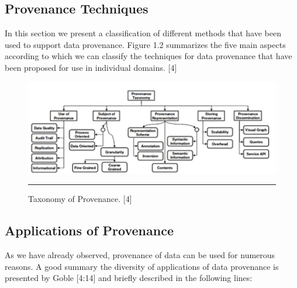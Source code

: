\subsection{Provenance Techniques}

In this section we present a classification of different methods that have been used to support data provenance. Figure 1.2 summarizes the five main aspects according to which we can classify the techniques for data provenance that have been proposed for use in individual domains. [4]

\begin{figure}[htbp]
	\centering
		\includegraphics{./Figures/figure2.pdf}
		\rule{35em}{0.5pt}
	\caption[Taxonomy of Provenance]{Taxonomy of Provenance. [4]}
	\label{fig:provTaxonomy}
\end{figure}


\subsection{Applications of Provenance}

As we have already observed, provenance of data can be used for numerous reasons. A good summary the diversity of applications of data provenance is presented by Goble [4:14] and briefly described in the following lines:

